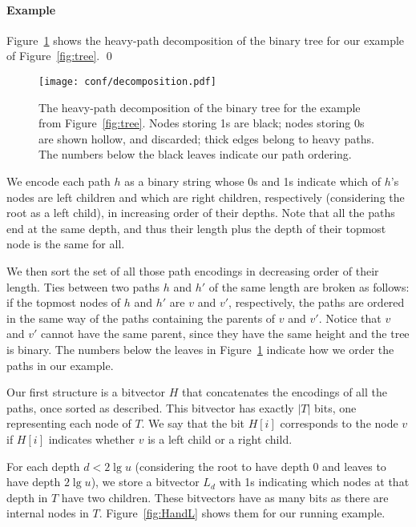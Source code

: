 \documentclass{elsarticle}
\newenvironment{example}{\paragraph{Example}}{\qed \medskip }
\begin{document}
\begin{example}
Figure~\ref{fig:decomposition} shows the heavy-path decomposition of the binary tree for our example of Figure~\ref{fig:tree}. 
\end{example}

\begin{figure}
\begin{center}
\texttt{[image: conf/decomposition.pdf]}
\caption{The heavy-path decomposition of the binary tree for the example from Figure~\ref{fig:tree}.  Nodes storing 1s are black; nodes storing 0s are shown hollow, and discarded; thick edges belong to heavy paths.  The numbers below the black leaves indicate our path ordering.}
\label{fig:decomposition}
\end{center}
\end{figure}

We encode each  path $h$ as a binary string whose 0s and 1s indicate which of $h$'s nodes are left children and which are right children, respectively (considering the root as a left child), in increasing order of their depths. Note that all the  paths end at the same depth, and thus their length plus the depth of their topmost node is the same for all.  

We then sort the set of all those path encodings in decreasing order of their length. Ties between two paths $h$ and $h'$ of the same length are broken as follows: if the topmost nodes of $h$ and $h'$ are $v$ and $v'$, respectively, the paths are ordered in the same way of the paths containing the parents of $v$ and $v'$. Notice that $v$ and $v'$ cannot have the same parent, since they have the same height and the tree is binary. The numbers below the leaves in Figure~\ref{fig:decomposition} indicate how we order the paths in our example.  

Our first structure is a bitvector $H$ that concatenates the encodings of all the  paths, once sorted as described. This bitvector has exactly $|T|$ bits, one representing each node of $T$. We say that the bit \(H [i]\) corresponds to the node $v$ if \(H [i]\) indicates whether $v$ is a left child or a right child.

For each depth \(d < 2\lg u\) (considering the root to have depth 0 and leaves to have depth \(2\lg u\)), we store a bitvector $L_d$ with 1s indicating which nodes at that depth in $T$ have two children. These bitvectors have as many bits as there are internal nodes in $T$.  Figure~\ref{fig:HandL} shows them for our running example.
\end{document}
